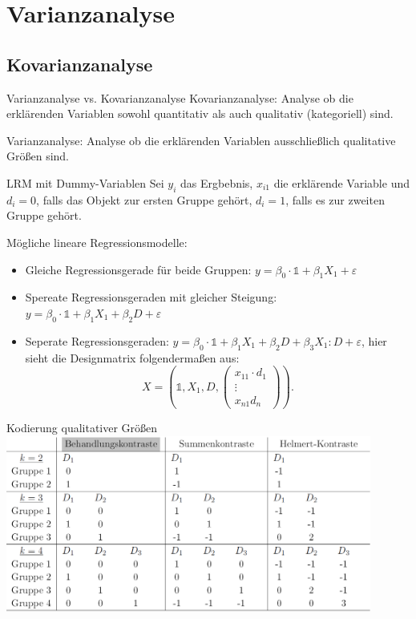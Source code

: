 \section{Varianzanalyse}

\subsection{Kovarianzanalyse}

\begin{karte}{Varianzanalyse vs. Kovarianzanalyse}
Kovarianzanalyse: Analyse ob die erklärenden Variablen sowohl quantitativ als auch qualitativ (kategoriell) sind.

Varianzanalyse: Analyse ob die erklärenden Variablen ausschließlich qualitative Größen sind.
\end{karte}

\begin{karte}{LRM mit Dummy-Variablen}
Sei \(y_i\) das Ergbebnis, \(x_{i1}\) die erklärende Variable und \(d_i = 0\), falls das Objekt zur ersten 
Gruppe gehört, \(d_i = 1\), falls es zur zweiten Gruppe gehört. 

Mögliche lineare Regressionsmodelle: 
\begin{itemize}
    \item Gleiche Regressionsgerade für beide Gruppen: \(y = \beta_0 \cdot \mathds{1} + \beta_1 X_1 + \varepsilon\)
    \item Spereate Regressionsgeraden mit gleicher Steigung: \(y = \beta_0 \cdot \mathds{1} + \beta_1 X_1 + \beta_2 D + \varepsilon \)
    \item Seperate Regressionsgeraden: \(y = \beta_0 \cdot \mathds{1} + \beta_1 X_1 + \beta_2 D + \beta_3 X_1:D + \varepsilon\), 
    hier sieht die Designmatrix folgendermaßen aus: 
    \[ X = \left( \mathds{1}, X_1, D, \begin{pmatrix}
        x_{11}\cdot d_1 \\ \vdots \\ x_{n1} d_n
    \end{pmatrix} \right). \]
\end{itemize}
\end{karte}

\begin{karte}{Kodierung qualitativer Größen}
\includegraphics[width=0.9\textwidth]{kodierung-qualitativer-groessen.png}
\end{karte}

